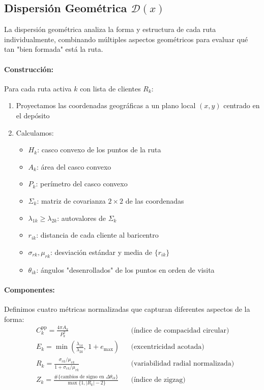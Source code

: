 \documentclass[11pt, a4paper]{article}
\begin{document}
\subsection{Dispersión Geométrica $\mathcal{D}(x)$}

La dispersión geométrica analiza la forma y estructura de cada ruta individualmente, combinando múltiples aspectos geométricos para evaluar qué tan "bien formada" está la ruta.

\paragraph{Construcción:} Para cada ruta activa $k$ con lista de clientes $R_k$:
\begin{enumerate}
\item Proyectamos las coordenadas geográficas a un plano local $(x,y)$ centrado en el depósito
\item Calculamos:
   \begin{itemize}
   \item $H_k$: casco convexo de los puntos de la ruta
   \item $A_k$: área del casco convexo
   \item $P_k$: perímetro del casco convexo
   \item $\Sigma_k$: matriz de covarianza $2{\times}2$ de las coordenadas
   \item $\lambda_{1k}\ge\lambda_{2k}$: autovalores de $\Sigma_k$
   \item $r_{ik}$: distancia de cada cliente al baricentro
   \item $\sigma_{rk},\mu_{rk}$: desviación estándar y media de $\{r_{ik}\}$
   \item $\theta_{ik}$: ángulos "desenrollados" de los puntos en orden de visita
   \end{itemize}
\end{enumerate}

\paragraph{Componentes:} Definimos cuatro métricas normalizadas que capturan diferentes aspectos de la forma:
\begin{align*}
&C^{\text{pp}}_k = \frac{4\pi A_k}{P_k^2} &&\text{(índice de compacidad circular)}\\
&E_k = \min\!\left(\frac{\lambda_{1k}}{\lambda_{2k}},\, 1 + e_{\max}\right) &&\text{(excentricidad acotada)}\\
&R_k = \frac{\sigma_{rk}/\mu_{rk}}{1+\sigma_{rk}/\mu_{rk}} &&\text{(variabilidad radial normalizada)}\\
&Z_k = \frac{\#\{\text{cambios de signo en }\Delta\theta_{ik}\}}{\max\{1,|R_k|-2\}} &&\text{(índice de zigzag)}
\end{align*}
\end{document}
